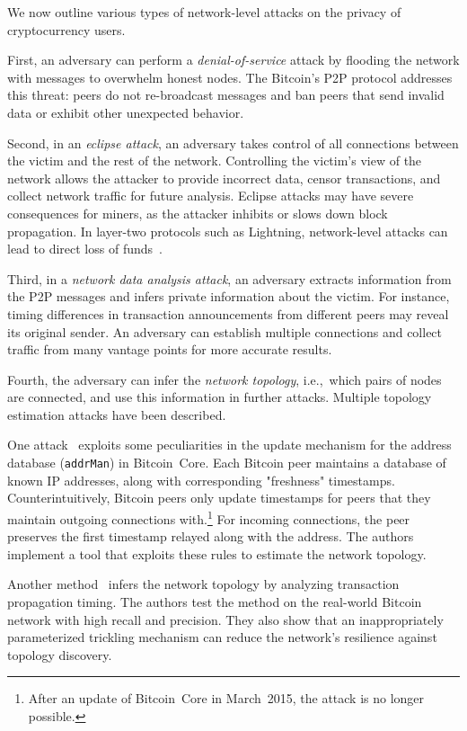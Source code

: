 We now outline various types of network-level attacks on the privacy of cryptocurrency users.

First, an adversary can perform a \textit{denial-of-service} attack by flooding the network with messages to overwhelm honest nodes.
The Bitcoin's P2P protocol addresses this threat: peers do not re-broadcast messages and ban peers that send invalid data or exhibit other unexpected behavior.

Second, in an \textit{eclipse attack}, an adversary takes control of all connections between the victim and the rest of the network.
Controlling the victim's view of the network allows the attacker to provide incorrect data, censor transactions, and collect network traffic for future analysis.
Eclipse attacks may have severe consequences for miners, as the attacker inhibits or slows down block propagation.
In layer-two protocols such as Lightning, network-level attacks can lead to direct loss of funds~\cite{Riard2020}.

Third, in a \textit{network data analysis attack}, an adversary extracts information from the P2P messages and infers private information about the victim.
For instance, timing differences in transaction announcements from different peers may reveal its original sender.
An adversary can establish multiple connections and collect traffic from many vantage points for more accurate results.

Fourth, the adversary can infer the \textit{network topology}, i.e.,~which pairs of nodes are connected, and use this information in further attacks.
Multiple topology estimation attacks have been described.

One attack~\cite{Miller2015} exploits some peculiarities in the update mechanism for the address database (\texttt{addrMan}) in Bitcoin~Core.
Each Bitcoin peer maintains a database of known IP addresses, along with corresponding "freshness" timestamps.
Counterintuitively, Bitcoin peers only update timestamps for peers that they maintain outgoing connections with.\footnote{After an update of Bitcoin~Core in March~2015, the attack is no longer possible.}
For incoming connections, the peer preserves the first timestamp relayed along with the address.
The authors implement a tool that exploits these rules to estimate the network topology.

Another method~\cite{Neudecker2016} infers the network topology by analyzing transaction propagation timing.
The authors test the method on the real-world Bitcoin network with high recall and precision.
They also show that an inappropriately parameterized trickling mechanism can reduce the network's resilience against topology discovery.

